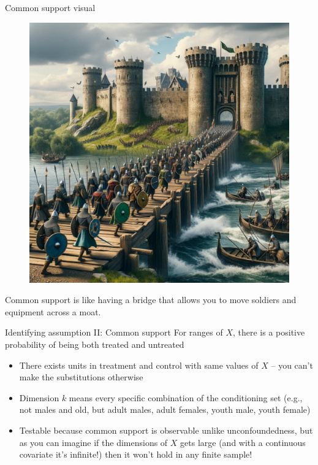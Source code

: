 \documentclass{beamer}
\begin{document}
\begin{frame}{Common support visual}

  \begin{figure}
    \includegraphics[scale=0.17]{./lecture_includes/matching_support.png}
  \end{figure}
  
Common support is like having a bridge that allows you to move soldiers and equipment across a moat. 

\end{frame}




\begin{frame}[plain]

	\begin{block}{Identifying assumption II: Common support}
	For ranges of $X$, there is a positive probability of being both treated and untreated
	\end{block}
	
	\begin{itemize}
	\item There exists units in treatment and control with same values of $X$ -- you can't make the substitutions otherwise
	\item Dimension $k$ means every specific combination of the conditioning set (e.g., not males and old, but adult males, adult females, youth male, youth female)
	\item Testable because common support is observable unlike unconfoundedness, but as you can imagine if the dimensions of $X$ gets large (and with a continuous covariate it's infinite!) then it won't hold in any finite sample!
	\end{itemize}
	
	
\end{frame}
\end{document}

